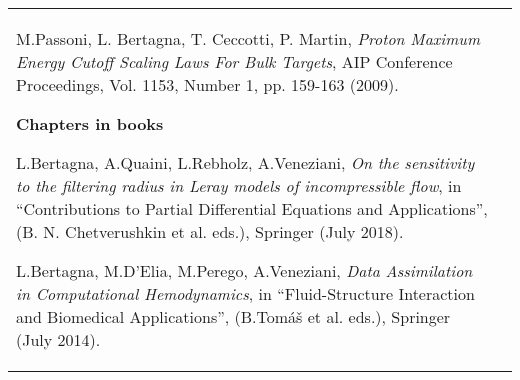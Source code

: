 \documentclass[10pt]{article}
\begin{document}
\begin{tabular}{p{2.5cm}|p{15.5cm}}
\vspace*{0.2cm}
M.Passoni, L. Bertagna, T. Ceccotti, P. Martin, \textit{Proton Maximum Energy Cutoff Scaling Laws For Bulk Targets}, AIP Conference Proceedings, Vol. 1153, Number 1, pp. 159-163 (2009).

\vspace*{0.2cm}
\textbf{Chapters in books}

\vspace*{0.2cm}
L.Bertagna, A.Quaini, L.Rebholz, A.Veneziani, \textit{On the sensitivity to the filtering radius in Leray models of incompressible flow}, in ``Contributions to Partial Differential Equations and Applications'', (B. N. Chetverushkin et al. eds.), Springer (July 2018).

\vspace*{0.2cm}
L.Bertagna, M.D'Elia, M.Perego, A.Veneziani, \textit{Data Assimilation in Computational Hemodynamics}, in ``Fluid-Structure Interaction and Biomedical Applications'', (B.Tomáš et al. eds.), Springer (July 2014).
\vspace{0.2cm}
\\
\end{tabular}



\end{document}
